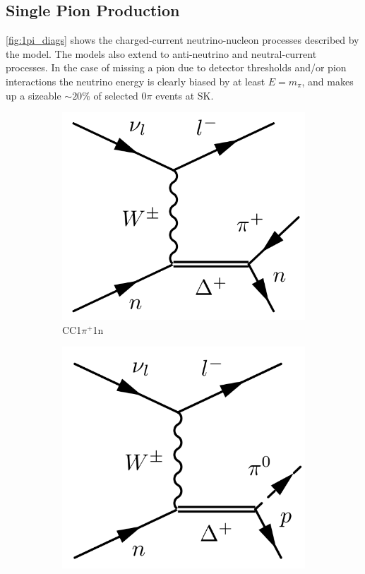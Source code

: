 \subsection{Single Pion Production}
\autoref{fig:1pi_diags} shows the charged-current neutrino-nucleon processes described by the model. The models also extend to anti-neutrino and neutral-current processes. In the case of missing a pion due to detector thresholds and/or pion interactions the neutrino energy is clearly biased by at least $E=m_\pi$, and makes up a sizeable $\sim20\%$ of selected 0$\pi$ events at SK.
\begin{figure}[h]
	\centering
	\begin{subfigure}[t]{0.32\textwidth}
		\includegraphics[width=\textwidth, trim={0mm 0mm 0mm 0mm}, clip,page=1]{figures/niwg/diagrams/CC1npip}
		\caption{CC1$\pi^+$1n}
	\end{subfigure}
	\begin{subfigure}[t]{0.32\textwidth}
		\includegraphics[width=\textwidth, trim={0mm 0mm 0mm 0mm}, clip,page=1]{figures/niwg/diagrams/CC1pi0}

\end{subfigure}
\end{figure}
